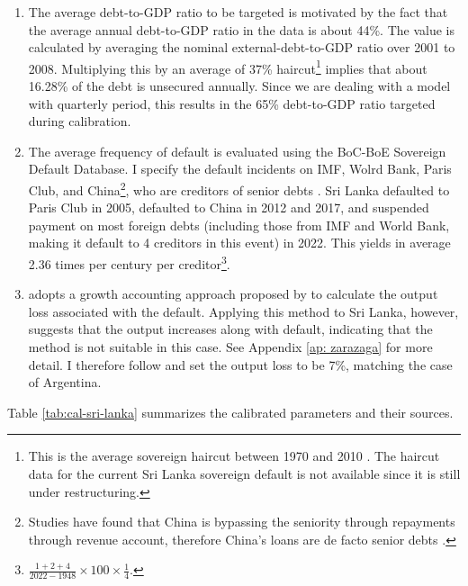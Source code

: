 \begin{enumerate}[label = (\roman*)]
    \item
    The average debt-to-GDP ratio to be targeted is motivated by the fact that the average annual debt-to-GDP ratio in the data is about 44\%.
    The value is calculated by averaging the nominal external-debt-to-GDP ratio over 2001 to 2008\footnotemark{}.
    Multiplying this by an average of 37\% haircut\footnote{This is the average sovereign haircut between 1970 and 2010 \citep{Cruces-Trebesch-13}. The haircut data for the current Sri Lanka sovereign default is not available since it is still under restructuring.} implies that about 16.28\% of the debt is unsecured annually\footnotemark{}.
    Since we are dealing with a model with quarterly period, this results in the 65\% debt-to-GDP ratio targeted during calibration.
    \item
    The average frequency of default is evaluated using the BoC-BoE Sovereign Default Database. I specify the default incidents on IMF, Wolrd Bank, Paris Club, and China\footnote{
        Studies have found that China is bypassing the seniority through repayments through revenue account, therefore China's loans are de facto senior debts \citep{Gelpern-22,Chen-Muyang-23-china-debt-seniority}.
    }, who are creditors of senior debts \citep{debt-seniority-19}. Sri Lanka defaulted to Paris Club in 2005, defaulted to China in 2012 and 2017, and suspended payment on most foreign debts (including those from IMF and World Bank, making it default to 4 creditors in this event) in 2022. This yields in average 2.36 times per century per creditor\footnote{$\frac{1+2+4}{2022 - 1948}\times 100 \times \frac{1}{4}$. }.
    \item  \citet{Na-18} adopts a growth accounting approach proposed by \citet{zarazaga-12} to calculate the output loss associated with the default. Applying this method to Sri Lanka, however, suggests that the output increases along with default, indicating that the method is not suitable in this case. See Appendix \ref{ap: zarazaga} for more detail. I therefore follow \citet{Na-18} and set the output loss to be 7\%, matching the case of Argentina.
\end{enumerate}
Table \ref{tab:cal-sri-lanka} summarizes the calibrated parameters and their sources.


